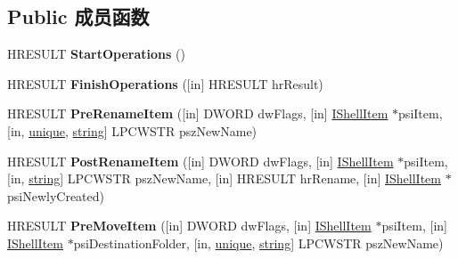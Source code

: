 \subsection*{Public 成员函数}
\begin{DoxyCompactItemize}
\item 
\mbox{\label{interface_i_file_operation_progress_sink_a8e34a71a6935e4b03c5ed5dc1bcba29f}} 
H\+R\+E\+S\+U\+LT {\bfseries Start\+Operations} ()
\item 
\mbox{\label{interface_i_file_operation_progress_sink_a988524a52cc7c90eeb8a927b68f8c334}} 
H\+R\+E\+S\+U\+LT {\bfseries Finish\+Operations} (\mbox{[}in\mbox{]} H\+R\+E\+S\+U\+LT hr\+Result)
\item 
\mbox{\label{interface_i_file_operation_progress_sink_a1e78405c5b45f699555028e7a1a9176e}} 
H\+R\+E\+S\+U\+LT {\bfseries Pre\+Rename\+Item} (\mbox{[}in\mbox{]} D\+W\+O\+RD dw\+Flags, \mbox{[}in\mbox{]} \hyperlink{interface_i_shell_item}{I\+Shell\+Item} $\ast$psi\+Item, \mbox{[}in, \hyperlink{interfaceunique}{unique}, \hyperlink{structstring}{string}\mbox{]} L\+P\+C\+W\+S\+TR psz\+New\+Name)
\item 
\mbox{\label{interface_i_file_operation_progress_sink_a4e78644f01255ef2a5a1419f2e7359b2}} 
H\+R\+E\+S\+U\+LT {\bfseries Post\+Rename\+Item} (\mbox{[}in\mbox{]} D\+W\+O\+RD dw\+Flags, \mbox{[}in\mbox{]} \hyperlink{interface_i_shell_item}{I\+Shell\+Item} $\ast$psi\+Item, \mbox{[}in, \hyperlink{structstring}{string}\mbox{]} L\+P\+C\+W\+S\+TR psz\+New\+Name, \mbox{[}in\mbox{]} H\+R\+E\+S\+U\+LT hr\+Rename, \mbox{[}in\mbox{]} \hyperlink{interface_i_shell_item}{I\+Shell\+Item} $\ast$psi\+Newly\+Created)
\item 
\mbox{\label{interface_i_file_operation_progress_sink_a3baa7f706f55aefdf58dd6d718892459}} 
H\+R\+E\+S\+U\+LT {\bfseries Pre\+Move\+Item} (\mbox{[}in\mbox{]} D\+W\+O\+RD dw\+Flags, \mbox{[}in\mbox{]} \hyperlink{interface_i_shell_item}{I\+Shell\+Item} $\ast$psi\+Item, \mbox{[}in\mbox{]} \hyperlink{interface_i_shell_item}{I\+Shell\+Item} $\ast$psi\+Destination\+Folder, \mbox{[}in, \hyperlink{interfaceunique}{unique}, \hyperlink{structstring}{string}\mbox{]} L\+P\+C\+W\+S\+TR psz\+New\+Name)

\end{DoxyCompactItemize}
